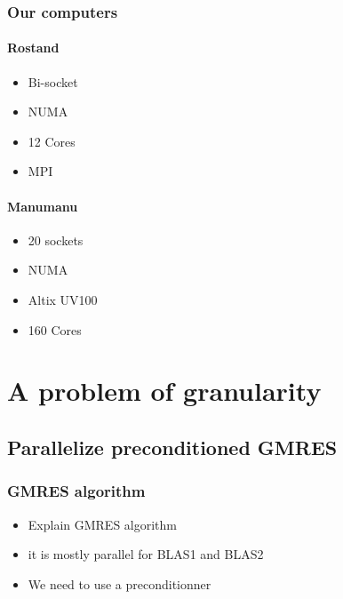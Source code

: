 \documentclass[oneside,12t]{classes/Thesis}
\begin{document}
\subsection{Our computers}
\subsubsection{Rostand}
  \begin{itemize}
    \item Bi-socket
    \item NUMA
    \item 12 Cores
    \item MPI
  \end{itemize}
\subsubsection{Manumanu}
  \begin{itemize}
    \item 20 sockets
    \item NUMA
    \item Altix UV100
    \item 160 Cores
  \end{itemize}






\chapter{A problem of granularity}
\minitoc
\vspace{1cm}
\section{Parallelize preconditioned GMRES}
\subsection{GMRES algorithm}
  \begin{itemize}
    \item Explain GMRES algorithm
    \item it is mostly parallel for BLAS1 and BLAS2
    \item We need to use a preconditionner
  \end{itemize}
\end{document}
